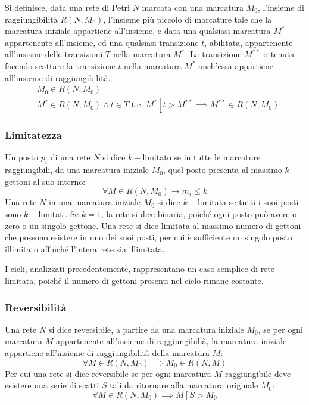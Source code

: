 \documentclass{article}
\numberwithin{equation}{subsection}
\begin{document}
Si definisce, data una rete di Petri $N$ marcata con una marcatura $M_0$, l'insieme di raggiungibilità $R(N,M_0)$, l'insieme più piccolo di marcature tale che la marcatura 
iniziale appartiene all'insieme, e data una qualsiasi marcatura $M^*$ appartenente all'insieme, ed una qualsiasi transizione $t$, abilitata, appartenente all'insisme delle transizioni 
$T$ nella marcatura $M^*$. La transizione $M^{**}$ ottenuta facendo scattare la transizione $t$ nella marcatura $M^*$ anch'essa appartiene all'insieme di raggiungibilità. 
\begin{align*}
    &M_0\in R(N,M_0)\\
    &M^*\in R(N,M_0)\land t\in T\mbox{ t.c. } M^*\left[\right.t>M^{**}\implies M^{**}\in R(N,M_0)
\end{align*}

\subsubsection{Limitatezza}

Un posto $p_i$ di una rete $N$ si dice $k-$limitato se in tutte le marcature raggiungibili, da una marcatura iniziale $M_0$, quel posto presenta al massimo $k$ gettoni al 
suo interno:
\begin{equation*}
    \forall M\in R(N,M_0)\to m_i\leq k
\end{equation*} 
Una rete $N$ in una marcatura iniziale $M_0$ si dice $k-$limitata se tutti i suoi posti sono $k-$limitati. Se $k=1$, la rete si dice binaria, poiché ogni 
posto può avere o zero o un singolo gettone. Una rete si dice limitata al massimo numero di gettoni che possono esistere in uno dei suoi posti, per cui è sufficiente un 
singolo posto illimitato affinché l'intera rete sia illimitata. 

I cicli, analizzati precedentemente, rappresentano un caso semplice di rete limitata, poiché il numero di gettoni presenti nel ciclo rimane costante. 

\subsubsection{Reversibilità}

Una rete $N$ si dice reversibile, a partire da una marcatura iniziale $M_0$, se per ogni marcatura $M$ appartenente all'insieme di raggiungibilià, la marcatura iniziale 
appartiene all'insieme di raggiungibilità della marcatura $M$:
\begin{equation*}
    \forall M\in R(N,M_0)\implies M_0\in R(N,M)
\end{equation*}
Per cui una rete si dice reversibile se per ogni marcatura $M$ raggiungibile deve esistere una serie di scatti $S$ tali da ritornare alla marcatura originale $M_0$:
\begin{equation*}
    \forall M\in R(N,M_0)\implies M\left[\right.S>M_0
\end{equation*} 
\end{document}
